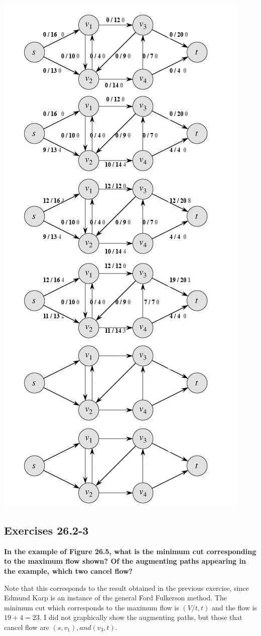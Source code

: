 \documentclass[10pt,fullpage]{article}
\begin{document}
\includegraphics[scale=0.6]{karp2601.png}

\subsection*{Exercises 26.2-3}
\textbf{In the example of Figure 26.5, what is the minimum cut
corresponding to the maximum flow shown? Of the augmenting paths
appearing in the example, which two cancel flow?}

Note that this corresponds to the result obtained in the previous
exercise, since Edmund Karp is an instance of the general Ford
Fulkerson method. The minimum cut which corresponds to the maximum
flow is $( V/{t}, {t} )$ and the flow is $19 + 4 = 23.$ I did not
graphically show the augmenting paths, but those that cancel flow
are $(s,v_1), and (v_3,t)$.
\end{document}

